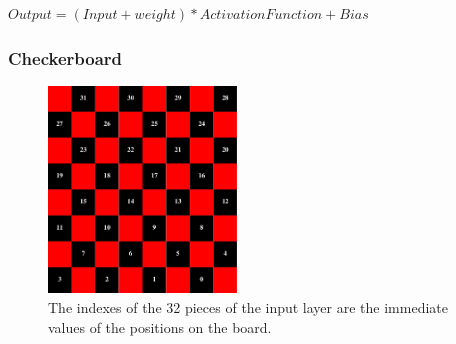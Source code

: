 \documentclass{beamer}
\begin{document}
\begin{frame}
	$Output = (Input + weight) * Activation Function + Bias$
\end{frame}

\begin{frame}
	\frametitle{Checkerboard}
	\begin{figure}[ht!]
		\centering
		\includegraphics[width=50mm]{checkerboard.png}
		\caption{The indexes of the 32 pieces of the input layer are the immediate values of the positions on the board. \label{overflow}}
	\end{figure}
\end{frame}
\end{document}
